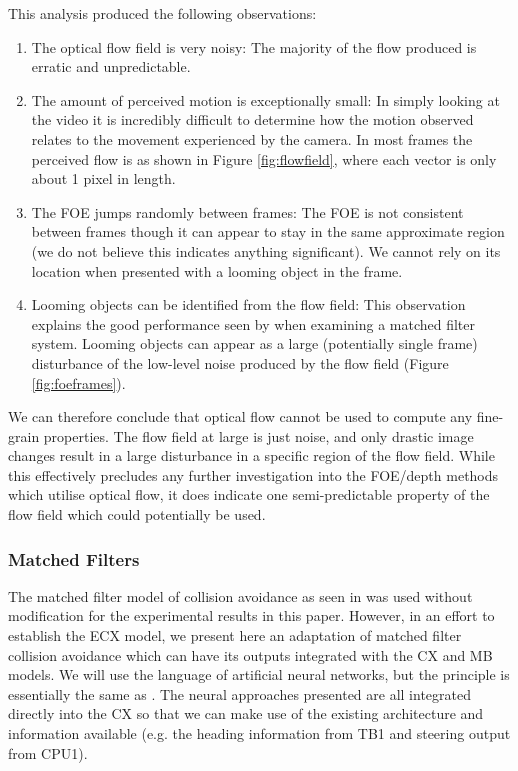 \documentclass[a4paper,11pt,twoside,openright]{article}
\begin{document}
This analysis produced the following observations:
\begin{enumerate}
\item{
  The optical flow field is very noisy: The majority of the flow produced
  is erratic and unpredictable.
}

\item{ The amount of perceived motion is exceptionally small: In
  simply looking at the video it is incredibly difficult to determine
  how the motion observed relates to the movement experienced by the
  camera. In most frames the perceived flow is as shown in Figure
  \ref{fig:flowfield}, where each vector is only about 1 pixel in
  length.  }

\item{ The FOE jumps randomly between frames: The FOE is not
  consistent between frames though it can appear to stay in the same
  approximate region (we do not believe this indicates anything
  significant). We cannot rely on its location when presented with a
  looming object in the frame.  }

\item{ Looming objects can be identified from the flow field: This
  observation explains the good performance seen by
  \cite{Mitchell2018} when examining a matched filter system. Looming
  objects can appear as a large (potentially single frame) disturbance
  of the low-level noise produced by the flow field (Figure
  \ref{fig:foeframes}).  }
\end{enumerate}

We can therefore conclude that optical flow cannot be used to compute
any fine-grain properties. The flow field at large is just noise, and
only drastic image changes result in a large disturbance in a specific
region of the flow field. While this effectively precludes any
further investigation into the FOE/depth methods which utilise optical
flow, it does indicate one semi-predictable property of the flow field
which could potentially be used.

\subsubsection{Matched Filters}
The matched filter model of collision avoidance as seen in
\cite{Mitchell2018} was used without modification for the experimental
results in this paper.  However, in an effort to establish the ECX
model, we present here an adaptation of matched filter collision
avoidance which can have its outputs integrated with the CX and MB
models. We will use the language of artificial neural networks, but
the principle is essentially the same as \cite{Mitchell2018}. The
neural approaches presented are all integrated directly into the CX so
that we can make use of the existing architecture and information
available (e.g. the heading information from TB1 and steering output
from CPU1).
\newline\par
\end{document}
